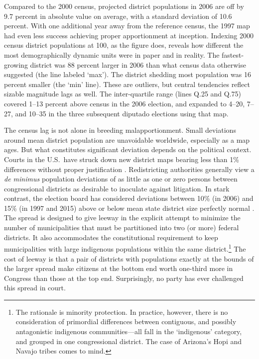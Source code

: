 \documentclass[letter,12pt]{article}
\begin{document}
Compared to the 2000 census, projected district populations in 2006 are off by 9.7 percent in absolute value on average, with a standard deviation of 10.6 percent. With one additional year away from the reference census, the 1997 map had even less success achieving proper apportionment at inception. Indexing 2000 census district populations at 100, as the figure does, reveals how different the most demographically dynamic units were in paper and in reality. The fastest-growing district was 88 percent larger in 2006 than what census data otherwise suggested (the line labeled `max'). The district shedding most population was 16 percent smaller (the `min' line). These are outliers, but central tendencies reflect sizable magnitude lags as well. The inter-quartile range (lines Q.25 and Q.75) covered 1--13 percent above census in the 2006 election, and expanded to 4--20, 7--27, and 10--35 in the three subsequent diputado elections using that map. 


The census lag is not alone in breeding malapportionment. Small deviations around mean district population are unavoidable worldwide, especially as a map ages. But what constitutes significant deviation depends on the political context. Courts in the U.S.\ have struck down new district maps bearing less than 1\% differences without proper justification \citep{tuckerApportionment.1985}. Redistricting authorities generally view a \emph{de minimus} population deviations of as little as one or zero persons between congressional districts as desirable to inoculate against litigation. In stark contrast, the election board has considered deviations between 10\% (in 2006) and 15\% (in 1997 and 2015) above or below mean state district size perfectly normal \citep{lujambio.vives.2008,trelles.mtz.polygob2012}. The spread is designed to give leeway in the explicit attempt to minimize the number of municipalities that must be partitioned into two (or more) federal districts. It also accommodates the constitutional requirement to keep municipalities with large indigenous populations within the same district.\footnote{The rationale is minority protection. In practice, however, there is no consideration of primordial differences between contiguous, and possibly antagonistic indigenous communities---all fall in the `indigenous' category, and grouped in one congressional district. The case of Arizona's Hopi and Navajo tribes comes to mind.} The cost of leeway is that a pair of districts with populations exactly at the bounds of the larger spread make citizens at the bottom end worth one-third more in Congress than those at the top end. Surprisingly, no party has ever challenged this spread in court. 
\end{document}
